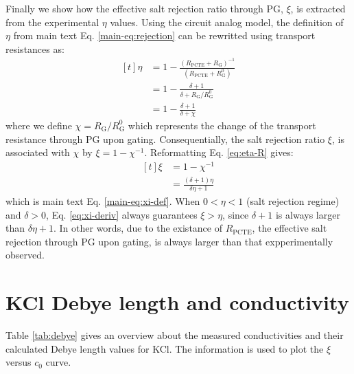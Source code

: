 \documentclass[manuscript=suppinfo,email=true, hyperref=true, keywords=false]{achemso}
\begin{document}
Finally we show how the effective salt rejection ratio through PG, $\xi$,
is extracted from the experimental $\eta$ values. Using the circuit
analog model, the definition of $\eta$ from main text
Eq. \ref{main-eq:rejection} can be rewritted using transport
resistances as:
\begin{equation}
  \begin{aligned}[t]
      \label{eq:eta-R}
  \eta &= 1 - {\displaystyle
    \frac{(R_{\mathrm{PCTE}} + R_{\mathrm{G}})^{-1}}
    {(R_{\mathrm{PCTE}} + R_{\mathrm{G}}^{0})}} \\
    &= 1 - \frac{\delta + 1}{\delta + R_{\mathrm{G}}/R_{\mathrm{G}}^{0}} \\
    &= 1 - \frac{\delta + 1}{\delta + \chi}
  \end{aligned}
\end{equation}
where we define $\chi = R_{\mathrm{G}}/R_{\mathrm{G}}^{0}$ which
represents the change of the transport resistance through PG upon
gating. Consequentially, the salt rejection ratio $\xi$, is associated
with $\chi$ by $\xi = 1 - \chi^{-1}$. Reformatting Eq. \ref{eq:eta-R}
gives:
\begin{equation}
  \label{eq:xi-deriv}
  \begin{aligned}[t]
    \xi &= 1 - \chi^{-1} \\
    &= \frac{(\delta + 1) \eta}{\delta\eta + 1}
  \end{aligned}
\end{equation}
which is main text Eq. \ref{main-eq:xi-def}. When $0<\eta<1$ (salt
rejection regime) and $\delta>0$, Eq. \ref{eq:xi-deriv} always
guarantees $\xi>\eta$, since $\delta + 1$ is always larger than
$\delta\eta + 1$. In other words, due to the existance of
$R_{\mathrm{PCTE}}$, the effective salt rejection through PG upon
gating, is always larger than that expperimentally observed.

\section{KCl Debye length and conductivity}
\label{sec:debye}
Table \ref{tab:debye} gives an overview about the measured
conductivities and their calculated Debye length values for KCl. The
information is used to plot the $\xi$ versus $c_{0}$ curve.
\end{document}
